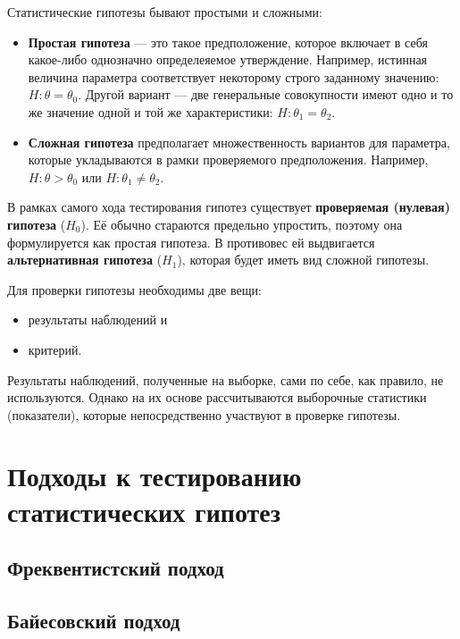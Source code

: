 \documentclass[
  letterpaper,
  DIV=11,
  numbers=noendperiod]{scrreprt}
\providecommand{\tightlist}{%
  \setlength{\itemsep}{0pt}\setlength{\parskip}{0pt}}\usepackage{longtable,booktabs,array}
\theoremstyle{definition}
\theoremstyle{remark}
\begin{document}
Статистические гипотезы бывают простыми и сложными:

\begin{itemize}
\tightlist
\item
  \textbf{Простая гипотеза} --- это такое предположение, которое
  включает в себя какое-либо однозначно определеяемое утверждение.
  Например, истинная величина параметра соответствует некоторому строго
  заданному значению: \(H : \theta = \theta_0\). Другой вариант --- две
  генеральные совокупности имеют одно и то же значение одной и той же
  характеристики: \(H : \theta_1 = \theta_2\).
\item
  \textbf{Сложная гипотеза} предполагает множественность вариантов для
  параметра, которые укладываются в рамки проверяемого предположения.
  Например, \(H : \theta > \theta_0\) или
  \(H : \theta_1 \neq \theta_2\).
\end{itemize}

В рамках самого хода тестирования гипотез существует \textbf{проверяемая
(нулевая) гипотеза} (\(H_0\)). Её обычно стараются предельно упростить,
поэтому она формулируется как простая гипотеза. В противовес ей
выдвигается \textbf{альтернативная гипотеза} (\(H_1\)), которая будет
иметь вид сложной гипотезы.

Для проверки гипотезы необходимы две вещи:

\begin{itemize}
\tightlist
\item
  результаты наблюдений и
\item
  критерий.
\end{itemize}

Результаты наблюдений, полученные на выборке, сами по себе, как правило,
не используются. Однако на их основе рассчитываются выборочные
статистики (показатели), которые непосредственно участвуют в проверке
гипотезы.

\section{Подходы к тестированию статистических
гипотез}\label{stats-testing-approaches}

\subsection{Фреквентистский подход}\label{stats-testing-nhst}

\subsection{Байесовский подход}\label{stats-testing-bayes}
\end{document}
